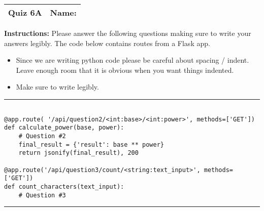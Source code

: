 \documentclass[11pt]{article}
\begin{document}
\begin{tabularx}{\textwidth}{l|X}
\textbf{Quiz 6A} &   \textbf{Name: } \\
\hline
\end{tabularx}


\noindent \textbf{Instructions:} Please answer the following questions making sure to write your answers legibly. The code below contains routes from a Flask app.
\begin{itemize}
\item Since we are writing python code please be careful about spacing / indent. Leave enough room that it is obvious when you want things indented. 
\item Make sure to write legibly.

\end{itemize}


{\color{lightgray}\hrule}
\begin{verbatim}

@app.route( '/api/question2/<int:base>/<int:power>', methods=['GET'])
def calculate_power(base, power):
    # Question #2
    final_result = {'result': base ** power}
    return jsonify(final_result), 200

@app.route('/api/question3/count/<string:text_input>', methods=['GET'])
def count_characters(text_input):
    # Question #3
\end{verbatim}
{\color{lightgray}\hrule}

\vspace{.5cm}
\end{document}

